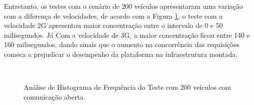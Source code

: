 \documentclass[
	12pt,				%
	oneside,			%
	a4paper,			%
	english,			%
	brazil				%
	]{abntex2ppgsi}
\begin{document}
Entretanto, os testes com o cenário de 200 veículos apresentaram uma variação com a diferença de velocidades, de acordo com a Figura \ref{fig:imgHistFreq200}, o teste com a velocidade 2G apresentou maior concentração entre o intervalo de 0 e 50 milisegundos. Já Com a velocidade de 3G, a maior concentração ficou entre 140 e 160 milisegundos, dando sinais que o aumento na concorrência das requisições comeca a prejudicar o desempenho da plataforma na infraestrutura montada. 
 
\begin{figure}[h!]
	\caption{Análise de Histograma de Frequência do Teste  com 200 veículos com comunicação aberta.}
	\centering
	\label{fig:imgHistFreq200}
	\\
\end{figure}
\end{document}
